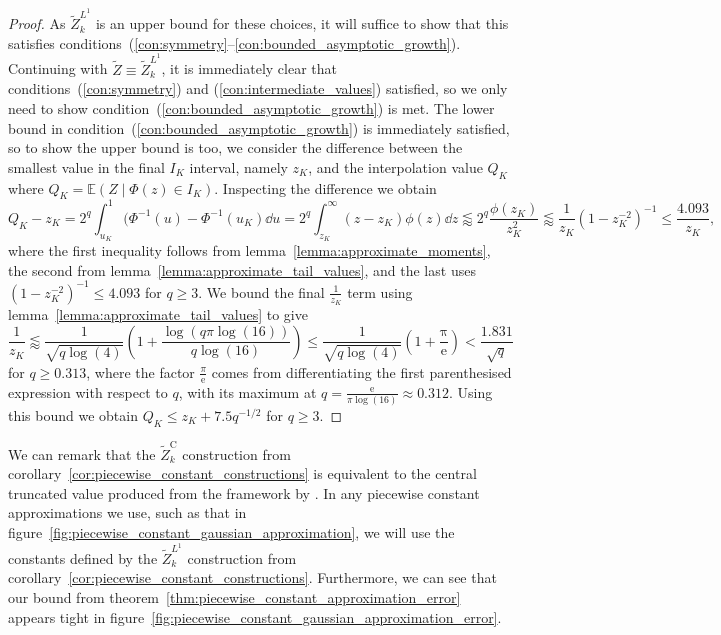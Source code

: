 \documentclass[manuscript,review]{acmart}
\begin{document}
\begin{proof}
As $ \widetilde{Z}_k^{L^1} $ is an upper bound for these choices, it will suffice to show that this satisfies conditions~(\ref{con:symmetry}--\ref{con:bounded_asymptotic_growth}).  Continuing with $ \widetilde{Z} \equiv  \widetilde{Z}_k^{L^1}$, it is immediately clear that conditions~(\ref{con:symmetry}) and (\ref{con:intermediate_values}) satisfied, so we only need to show condition~(\ref{con:bounded_asymptotic_growth}) is met. The lower bound in condition~(\ref{con:bounded_asymptotic_growth}) is immediately satisfied, so to show the upper bound is too, we consider the difference between the smallest value in the final $ I_K $ interval, namely $ z_K $, and the interpolation value $ Q_K $ where $ Q_K = \mathbb{E}(Z \mid \Phi(z) \in I_K) $. Inspecting the difference we obtain
\begin{equation*}
Q_K - z_K = 2^q \int_{u_K}^{1} (\Phi^{-1}(u) - \Phi^{-1}(u_K) \dd{u} = 2^q \int_{z_K}^{\infty} (z - z_K) \phi(z) \dd{z} \lessapprox  2^q \dfrac{\phi(z_K)}{z_K^2} \lessapprox \dfrac{1}{z_K} (1 - z_K^{-2})^{-1} \leq \dfrac{4.093}{z_K},
\end{equation*}
where the first inequality follows from lemma~\ref{lemma:approximate_moments}, the second from lemma~\ref{lemma:approximate_tail_values}, and the last uses $ (1 - z_K^{-2})^{-1} \leq 4.093 $ for $ q \geq 3 $. We bound the final $ \tfrac{1}{z_K} $ term using lemma~\ref{lemma:approximate_tail_values} to give
\begin{equation*}
\dfrac{1}{z_K} \lessapprox \frac{1}{\sqrt{q\log(4)}} \left(1 + \frac{\log(q\pi\log(16))}{q\log(16)}\right) \leq  \frac{1}{\sqrt{q\log(4)}}\left(1 +  \frac{\mathrm{\pi}}{\mathrm{e}}\right) <  \frac{1.831}{\sqrt{q}}
\end{equation*}
for $ q \geq 0.313 $, where the factor $ \tfrac{\pi}{\mathrm{e}} $ comes from differentiating the first parenthesised expression with respect to $ q $, with its maximum at $ q = \tfrac{\mathrm{e}}{\pi\log(16)} \approx 0.312 $. Using this bound we obtain $ Q_K \leq z_K + 7.5 q^{-1/2} $ for $ q \geq 3 $. \qedhere
\end{proof}

We can remark that the $ \widetilde{Z}_k^\mathrm{C} $ construction from corollary~\ref{cor:piecewise_constant_constructions} is equivalent to the central truncated value produced from the framework by \citet[(4)]{giles2019random_quadrature}. In any piecewise constant approximations we use, such as that in figure~\ref{fig:piecewise_constant_gaussian_approximation}, we will use the constants defined by  the $ \widetilde{Z}_k^{L^1} $ construction from corollary~\ref{cor:piecewise_constant_constructions}. Furthermore, we can see that our bound from theorem~\ref{thm:piecewise_constant_approximation_error} appears tight in figure~\ref{fig:piecewise_constant_gaussian_approximation_error}.
\end{document}
